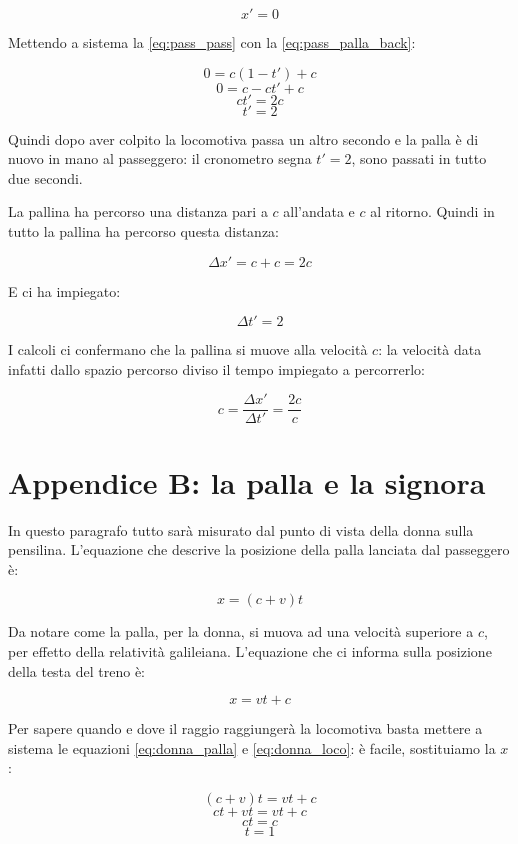 \begin{equation} \label{eq:pass_pass} 
   x' = 0
\end{equation}

Mettendo a sistema la \ref{eq:pass_pass} con la \ref{eq:pass_palla_back}:

$$ 0 = c(1-t') + c $$
$$ 0 = c -ct' + c $$
$$ ct' = 2c $$
$$ t' = 2 $$

Quindi dopo aver colpito la locomotiva passa un altro secondo e la palla è di nuovo in mano al passeggero: il cronometro segna $t'=2$, sono passati in tutto due secondi.

La pallina ha percorso una distanza pari a $c$ all'andata e $c$ al ritorno. Quindi in tutto la pallina ha percorso questa distanza:

$$\Delta x' = c+c = 2c $$

E ci ha impiegato:

$$\Delta t' = 2 $$

I calcoli ci confermano che la pallina si muove alla velocità $c$: la velocità data infatti dallo spazio percorso diviso il tempo impiegato a percorrerlo:

$$ c =\frac{\Delta x'}{\Delta t'}=\frac{2c}{c} $$


\section{Appendice B: la palla e la signora}

In questo paragrafo tutto sarà misurato dal punto di vista della donna sulla pensilina. L'equazione che descrive la posizione della palla lanciata dal passeggero è:

\begin{equation} \label{eq:donna_palla} 
  x=(c+v)t
\end{equation}


Da notare come la palla, per la donna, si muova ad una velocità superiore a $c$, per effetto della relatività galileiana. L'equazione che ci informa sulla posizione della testa del treno è:

\begin{equation} \label{eq:donna_loco} 
   x=vt+c
\end{equation}


Per sapere quando e dove il raggio raggiungerà la locomotiva basta mettere a sistema le equazioni \ref{eq:donna_palla} e \ref{eq:donna_loco}: è facile, sostituiamo la $x$:

$$ (c+v) t = vt + c $$
$$ ct+vt = vt + c $$
$$ ct = c $$
$$ t = 1 $$

